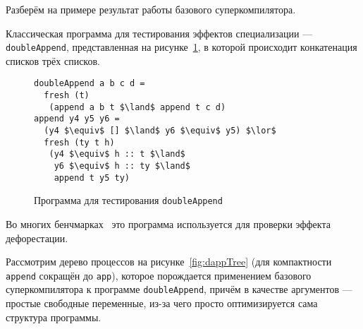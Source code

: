 

Разберём на примере результат работы базового суперкомпилятора.

Классическая программа для тестирования эффектов специализации ---
\lstinline{doubleAppend}, представленная на рисунке~\ref{fig:dappCode},
в которой происходит конкатенация списков трёх списков.

\begin{figure}[h!]
\begin{lstlisting}
doubleAppend a b c d =
  fresh (t)
   (append a b t $\land$ append t c d)
append y4 y5 y6 =
  (y4 $\equiv$ [] $\land$ y6 $\equiv$ y5) $\lor$
  fresh (ty t h)
   (y4 $\equiv$ h :: t $\land$
    y6 $\equiv$ h :: ty $\land$
    append t y5 ty)
\end{lstlisting}
\caption{Программа для тестирования \lstinline{doubleAppend}}
\label{fig:dappCode}
\end{figure}

Во многих бенчмарках~\cite{cpdPract, controlPoly} это программа используется
для проверки эффекта дефорестации.

Рассмотрим дерево процессов на рисунке~\ref{fig:dappTree}
(для компактности \lstinline{append} сокращён до \lstinline{app}),
которое порождается применением базового
суперкомпилятора к программе \lstinline{doubleAppend}, причём в
качестве аргументов --- простые свободные переменные, из-за чего
просто оптимизируется сама структура программы.

